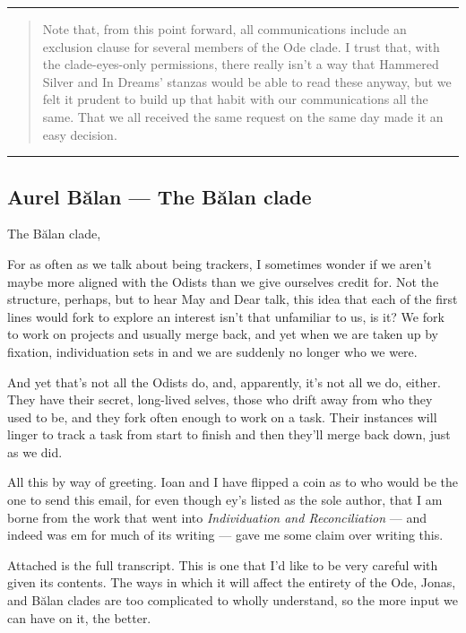 \begin{center}\rule{0.5\linewidth}{0.5pt}\end{center}

\begin{quote}
Note that, from this point forward, all communications include an exclusion clause for several members of the Ode clade. I trust that, with the clade-eyes-only permissions, there really isn't a way that Hammered Silver and In Dreams' stanzas would be able to read these anyway, but we felt it prudent to build up that habit with our communications all the same. That we all received the same request on the same day made it an easy decision.
\end{quote}

\begin{center}\rule{0.5\linewidth}{0.5pt}\end{center}

\hypertarget{aurel-bux103lan-the-bux103lan-clade}{%
\subsection{Aurel Bălan — The Bălan clade}\label{aurel-bux103lan-the-bux103lan-clade}}

The Bălan clade,

For as often as we talk about being trackers, I sometimes wonder if we aren't maybe more aligned with the Odists than we give ourselves credit for. Not the structure, perhaps, but to hear May and Dear talk, this idea that each of the first lines would fork to explore an interest isn't that unfamiliar to us, is it? We fork to work on projects and usually merge back, and yet when we are taken up by fixation, individuation sets in and we are suddenly no longer who we were.

And yet that's not all the Odists do, and, apparently, it's not all we do, either. They have their secret, long-lived selves, those who drift away from who they used to be, and they fork often enough to work on a task. Their instances will linger to track a task from start to finish and then they'll merge back down, just as we did.

All this by way of greeting. Ioan and I have flipped a coin as to who would be the one to send this email, for even though ey's listed as the sole author, that I am borne from the work that went into \emph{Individuation and Reconciliation} — and indeed was em for much of its writing — gave me some claim over writing this.

Attached is the full transcript. This is one that I'd like to be very careful with given its contents. The ways in which it will affect the entirety of the Ode, Jonas, and Bălan clades are too complicated to wholly understand, so the more input we can have on it, the better.

